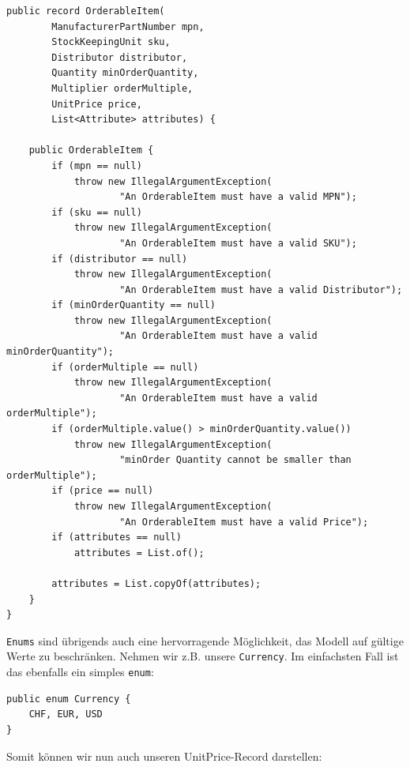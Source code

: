 \begin{listing}[H]
\begin{verbatim}
public record OrderableItem(
        ManufacturerPartNumber mpn,
        StockKeepingUnit sku,
        Distributor distributor,
        Quantity minOrderQuantity,
        Multiplier orderMultiple,
        UnitPrice price,
        List<Attribute> attributes) {

    public OrderableItem {
        if (mpn == null)
            throw new IllegalArgumentException(
                    "An OrderableItem must have a valid MPN");
        if (sku == null)
            throw new IllegalArgumentException(
                    "An OrderableItem must have a valid SKU");
        if (distributor == null)
            throw new IllegalArgumentException(
                    "An OrderableItem must have a valid Distributor");
        if (minOrderQuantity == null)
            throw new IllegalArgumentException(
                    "An OrderableItem must have a valid minOrderQuantity");
        if (orderMultiple == null)
            throw new IllegalArgumentException(
                    "An OrderableItem must have a valid orderMultiple");
        if (orderMultiple.value() > minOrderQuantity.value())
            throw new IllegalArgumentException(
                    "minOrder Quantity cannot be smaller than orderMultiple");
        if (price == null)
            throw new IllegalArgumentException(
                    "An OrderableItem must have a valid Price");
        if (attributes == null)
            attributes = List.of();
        
        attributes = List.copyOf(attributes);
    }
}
\end{verbatim}
\caption{Vollständig validierter OrderableItem Record}
\label{lst:recordValidatedOrderItemModel}
\end{listing}

\texttt{Enums} sind übrigends auch eine hervorragende Möglichkeit, das Modell 
auf gültige
Werte zu beschränken. Nehmen wir z.B. unsere \texttt{Currency}. Im einfachsten
Fall ist das ebenfalls ein simples \texttt{enum}: 

\begin{listing}[H]
\begin{verbatim}
public enum Currency {
    CHF, EUR, USD
}
\end{verbatim}
\caption{Currency als simple Enumeration}
\label{lst:currencyEnum}
\end{listing}

Somit können wir nun auch unseren UnitPrice-Record darstellen:

